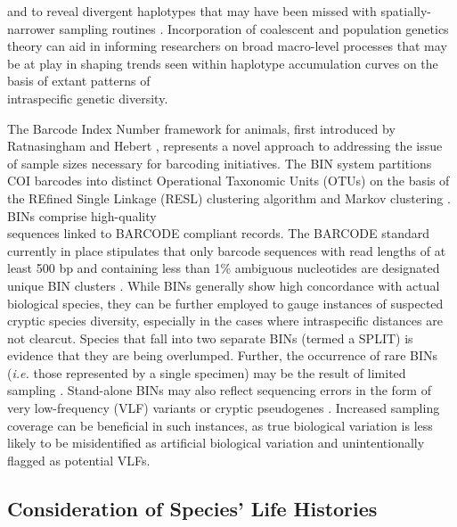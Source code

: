 and to reveal divergent haplotypes that may have been missed with spatially-narrower sampling routines \cite{monaghan2009accelerated}. Incorporation of coalescent and population genetics theory can aid in informing researchers on broad macro-level processes that may be at play in shaping trends seen within haplotype accumulation curves on the basis of extant patterns of \\ intraspecific genetic diversity. 

\vspace{5mm}
 
The Barcode Index Number framework for animals, first introduced by Ratnasingham and Hebert \cite{ratnasingham2013dna}, represents a novel approach to addressing the issue of sample sizes necessary for barcoding initiatives. The BIN system partitions COI barcodes into distinct Operational Taxonomic Units (OTUs) on the basis of the REfined Single Linkage (RESL) clustering algorithm and Markov clustering \cite{ratnasingham2013dna}. BINs comprise high-quality \\ sequences linked to BARCODE compliant records. The BARCODE standard currently in place stipulates that only barcode sequences with read lengths of at least 500 bp and containing less than 1\% ambiguous nucleotides are designated unique BIN clusters \cite{hanner2009data}. While BINs generally show high concordance with actual biological species, they can be further employed to gauge instances of suspected cryptic species diversity, especially in the cases where intraspecific distances are not clearcut.  Species that fall into two separate BINs (termed a SPLIT) is evidence that they are being overlumped. Further, the occurrence of rare BINs (\textit{i.e.} those represented by a single specimen) may be the result of limited sampling \cite{hausmann2013genetic, huemer2014testing}. Stand-alone BINs may also reflect sequencing errors in the form of very low-frequency (VLF) variants or cryptic pseudogenes \cite{stoeckle2012frequency, stoeckle2014dna}. Increased sampling coverage can be beneficial in such instances, as true biological variation is less likely to be misidentified as artificial biological variation and unintentionally flagged as potential VLFs.

\vspace{5mm}

\subsection{Consideration of Species' Life Histories}

